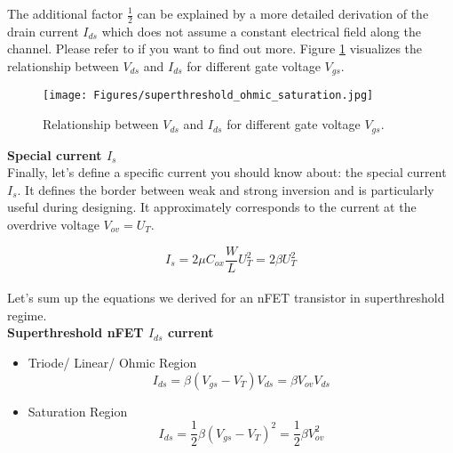 The additional factor $\frac{1}{2}$ can be explained by a more detailed derivation of the drain current $I_{ds}$ which does not assume a constant electrical field along the channel. Please refer to \cite{liu2002analog} if you want to find out more. Figure \ref{fig:superthreshold_ohmic_saturation} visualizes the relationship between $V_{ds}$ and $I_{ds}$ for different gate voltage $V_{gs}$.\\

\begin{figure}
    \centering
    \texttt{[image: Figures/superthreshold\_ohmic\_saturation.jpg]}
    \caption{Relationship between $V_{ds}$ and $I_{ds}$ for different gate voltage $V_{gs}$.}
    \label{fig:superthreshold_ohmic_saturation}
\end{figure}

\textbf{Special current $I_s$}\\

Finally, let's define a specific current you should know about: the special current $I_s$. It defines the border between weak and strong inversion and is particularly useful during designing. It approximately corresponds to the current at the overdrive voltage $V_{ov} = U_T$.

\begin{equation}
    I_s = 2 \mu C_{ox} \frac{W}{L} U_T^2 = 2 \beta U_T^2
\end{equation}\\

Let's sum up the equations we derived for an nFET transistor in superthreshold regime.\\

\textbf{Superthreshold nFET $I_{ds}$ current}
\begin{itemize}
    \item Triode/ Linear/ Ohmic Region
    \begin{equation}
        I_{ds} = \beta (V_{gs} - V_T) V_{ds} = \beta V_{ov} V_{ds}
    \end{equation}
    \item Saturation Region
    \begin{equation}
        I_{ds} = \frac{1}{2} \beta (V_{gs} - V_T)^2 = \frac{1}{2} \beta V_{ov}^2
    \end{equation}
\end{itemize}